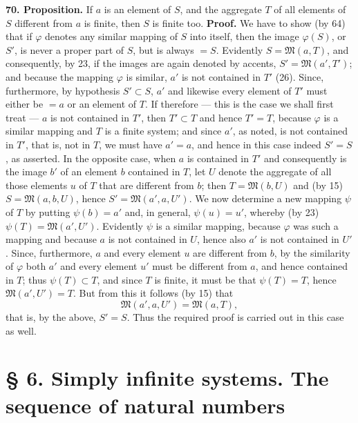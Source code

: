 \documentclass[11pt]{article}
\newcommand{\Mf}{\mathfrak{M}}
\newcommand{\partof}{\mathrel{\subset}}
\begin{document}
\noindent\textbf{70. Proposition.} If $a$ is an element of $S$, and the aggregate $T$ of all elements of $S$ different from $a$ is finite, then $S$ is finite too. \textbf{Proof.} We have to show (by 64) that if $\varphi$ denotes any similar mapping of $S$ into itself, then the image $\varphi(S)$, or $S'$, is never a proper part of $S$, but is always $=S$. Evidently $S=\Mf(a,T)$, and consequently, by 23, if the images are again denoted by accents, $S'=\Mf(a',T')$; and because the mapping $\varphi$ is similar, $a'$ is not contained in $T'$ (26). Since, furthermore, by hypothesis $S'\partof S$, $a'$ and likewise every element of $T'$ must either be $=a$ or an element of $T$. If therefore — this is the case we shall first treat — $a$ is not contained in $T'$, then $T'\partof T$ and hence $T'=T$, because $\varphi$ is a similar mapping and $T$ is a finite system; and since $a'$, as noted, is not contained in $T'$, that is, not in $T$, we must have $a'=a$, and hence in this case indeed $S'=S$, as asserted. In the opposite case, when $a$ is contained in $T'$ and consequently is the image $b'$ of an element $b$ contained in $T$, let $U$ denote the aggregate of all those elements $u$ of $T$ that are different from $b$; then $T=\Mf(b,U)$ and (by 15) $S=\Mf(a,b,U)$, hence $S'=\Mf(a',a,U')$. We now determine a new mapping $\psi$ of $T$ by putting $\psi(b)=a'$ and, in general, $\psi(u)=u'$, whereby (by 23) $\psi(T)=\Mf(a',U')$. Evidently $\psi$ is a similar mapping, because $\varphi$ was such a mapping and because $a$ is not contained in $U$, hence also $a'$ is not contained in $U'$. Since, furthermore, $a$ and every element $u$ are different from $b$, by the similarity of $\varphi$ both $a'$ and every element $u'$ must be different from $a$, and hence contained in $T$; thus $\psi(T)\partof T$, and since $T$ is finite, it must be that $\psi(T)=T$, hence $\Mf(a',U')=T$. But from this it follows (by 15) that
\[
\Mf(a',a,U')=\Mf(a,T),
\]
that is, by the above, $S'=S$. Thus the required proof is carried out in this case as well.

\section*{§ 6. Simply infinite systems. The sequence of natural numbers}
\end{document}
